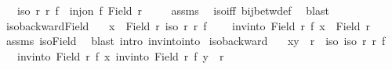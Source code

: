 \begin{isabellebody}
\ \ \ {\isachardoublequoteopen}iso\ r\ r{\isacharprime}{\kern0pt}\ f{\isachardoublequoteclose}\ \ {\isachardoublequoteopen}inj{\isacharunderscore}{\kern0pt}on\ f\ {\isacharparenleft}{\kern0pt}Field\ r{\isacharparenright}{\kern0pt}{\isachardoublequoteclose}\ \isanewline
%
\isadelimproof
\ \ %
\endisadelimproof
%
\isatagproof
{}\isamarkupfalse%
\ assms\ \isamarkupfalse%
\ iso{\isacharunderscore}{\kern0pt}iff{}\ bij{\isacharunderscore}{\kern0pt}betw{\isacharunderscore}{\kern0pt}def\ \isamarkupfalse%
\ blast%
\endisatagproof
{\isafoldproof}%
%
\isadelimproof
\isanewline
%
\endisadelimproof
\isanewline
{}\isamarkupfalse%
\ iso{\isacharunderscore}{\kern0pt}backward{\isacharunderscore}{\kern0pt}Field{\isacharcolon}{\kern0pt}\isanewline
\ \ \ {\isachardoublequoteopen}x\ {\isasymin}\ Field\ r{\isacharprime}{\kern0pt}{\isachardoublequoteclose}\ {\isachardoublequoteopen}iso\ r\ r{\isacharprime}{\kern0pt}\ f{\isachardoublequoteclose}\ \isanewline
\ \ \ {\isachardoublequoteopen}inv{\isacharunderscore}{\kern0pt}into\ {\isacharparenleft}{\kern0pt}Field\ r{\isacharparenright}{\kern0pt}\ f\ x\ {\isasymin}\ Field\ r{\isachardoublequoteclose}\isanewline
%
\isadelimproof
\ \ %
\endisadelimproof
%
\isatagproof
{}\isamarkupfalse%
\ assms\ iso{\isacharunderscore}{\kern0pt}Field\ \isamarkupfalse%
\ {\isacharparenleft}{\kern0pt}blast\ intro{\isacharbang}{\kern0pt}{\isacharcolon}{\kern0pt}\ inv{\isacharunderscore}{\kern0pt}into{\isacharunderscore}{\kern0pt}into{\isacharparenright}{\kern0pt}%
\endisatagproof
{\isafoldproof}%
%
\isadelimproof
\isanewline
%
\endisadelimproof
\isanewline
{}\isamarkupfalse%
\ iso{\isacharunderscore}{\kern0pt}backward{\isacharcolon}{\kern0pt}\isanewline
\ \ \ {\isachardoublequoteopen}{\isacharparenleft}{\kern0pt}x{\isacharcomma}{\kern0pt}y{\isacharparenright}{\kern0pt}\ {\isasymin}\ r{\isacharprime}{\kern0pt}{\isachardoublequoteclose}\ \ iso{\isacharcolon}{\kern0pt}\ {\isachardoublequoteopen}iso\ r\ r{\isacharprime}{\kern0pt}\ f{\isachardoublequoteclose}\ \isanewline
\ \ \ {\isachardoublequoteopen}{\isacharparenleft}{\kern0pt}inv{\isacharunderscore}{\kern0pt}into\ {\isacharparenleft}{\kern0pt}Field\ r{\isacharparenright}{\kern0pt}\ f\ x{\isacharcomma}{\kern0pt}\ inv{\isacharunderscore}{\kern0pt}into\ {\isacharparenleft}{\kern0pt}Field\ r{\isacharparenright}{\kern0pt}\ f\ y{\isacharparenright}{\kern0pt}\ {\isasymin}\ r{\isachardoublequoteclose}\isanewline

\end{isabellebody}
